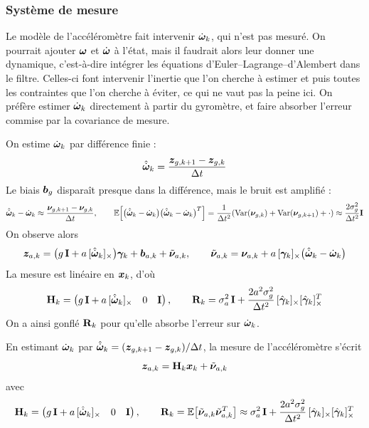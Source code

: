 \subsubsection{Système de mesure}
\begin{remarque}
    Le modèle de l'accéléromètre fait intervenir $\dot{\bm{\omega}}_k$, qui n'est pas mesuré.
    On pourrait ajouter $\bm{\omega}$ et $\dot{\bm{\omega}}$ à l'état, mais il faudrait alors leur
    donner une dynamique, c'est-à-dire intégrer les équations d'Euler--Lagrange--d'Alembert dans le filtre.
    Celles-ci font intervenir l'inertie que l'on cherche à estimer et puis toutes les contraintes que l'on cherche à éviter, ce qui ne vaut pas la peine ici.
    On préfère estimer $\dot{\bm{\omega}}_k$ directement à partir du gyromètre, et faire absorber l'erreur commise par la covariance de mesure.
\end{remarque}
On estime $\dot{\bm{\omega}}_k$ par différence finie :
\[
    \hat{\dot{\bm{\omega}}}_k = \frac{\bm{z}_{g,k+1} - \bm{z}_{g,k}}{\Delta t}
\]
Le biais $\bm{b}_g$ disparaît presque dans la différence, mais le bruit est amplifié :
\[
    \hat{\dot{\bm{\omega}}}_k - \dot{\bm{\omega}}_k \approx \frac{\bm{\nu}_{g,k+1} - \bm{\nu}_{g,k}}{\Delta t},
    \qquad
    \mathbb{E}\Bigl[\bigl(\hat{\dot{\bm{\omega}}}_k - \dot{\bm{\omega}}_k\bigr)\bigl(\hat{\dot{\bm{\omega}}}_k - \dot{\bm{\omega}}_k\bigr)^T\Bigr] = \frac{1}{\Delta t^2} (\operatorname{Var}(\bm{\nu}_{g, k}) + \operatorname{Var}(\bm{\nu}_{g, k+1}) + \cdot)
    \approx \frac{2\sigma_g^2}{\Delta t^2}\mathbf{I}
\]
On observe alors
\[
    \bm{z}_{a,k} = \bigl(g\,\mathbf{I} + a\,[\hat{\dot{\bm{\omega}}}_k]_{\times}\bigr)\bm{\gamma}_k + \bm{b}_{a,k} + \tilde{\bm{\nu}}_{a,k},
    \qquad
    \tilde{\bm{\nu}}_{a,k} = \bm{\nu}_{a,k} + a\,[\bm{\gamma}_k]_{\times}\bigl(\hat{\dot{\bm{\omega}}}_k - \dot{\bm{\omega}}_k\bigr)
\]
La mesure est linéaire en $\bm{x}_k$, d'où
\[
    \mathbf{H}_k = \begin{pmatrix} g\,\mathbf{I} + a\,[\hat{\dot{\bm{\omega}}}_k]_{\times} & 0 & \mathbf{I} \end{pmatrix},
    \qquad
    \mathbf{R}_k = \sigma_a^2\,\mathbf{I} + \frac{2a^2\sigma_g^2}{\Delta t^2}\,[\hat{\bm{\gamma}}_k]_{\times}[\hat{\bm{\gamma}}_k]_{\times}^T
\]
On a ainsi gonflé $\mathbf{R}_k$ pour qu'elle absorbe l'erreur sur $\dot{\bm{\omega}}
_k$.

\begin{proposition}
    En estimant $\dot{\bm{\omega}}_k$ par $\hat{\dot{\bm{\omega}}}_k = (\bm{z}_{g,k+1} - \bm{z}_{g,k})/\Delta t$,
    la mesure de l'accéléromètre s'écrit
    \[
        \bm{z}_{a,k} = \mathbf{H}_k\bm{x}_k + \tilde{\bm{\nu}}_{a,k}
    \]
    avec
    \[
        \mathbf{H}_k = \begin{pmatrix} g\,\mathbf{I} + a\,[\hat{\dot{\bm{\omega}}}_k]_{\times} & 0 & \mathbf{I} \end{pmatrix},
        \qquad
        \mathbf{R}_k = \mathbb{E}\bigl[\tilde{\bm{\nu}}_{a,k}\tilde{\bm{\nu}}_{a,k}^T\bigr]
        \approx \sigma_a^2\,\mathbf{I} + \frac{2a^2\sigma_g^2}{\Delta t^2}\,[\hat{\bm{\gamma}}_k]_{\times}[\hat{\bm{\gamma}}_k]_{\times}^T
    \]
\end{proposition}

